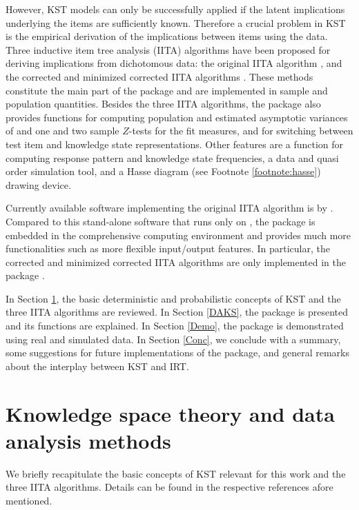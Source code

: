 \documentclass[nojss]{jss}
\begin{document}
However, KST models can only be successfully applied if the latent implications underlying the 
items are sufficiently known. Therefore a crucial problem in KST is the empirical derivation 
of the implications between items using the data.
Three inductive item tree analysis (IITA) algorithms have been proposed for deriving implications from dichotomous data: the original IITA algorithm \citep{Schrepp:03}, and the corrected and minimized corrected IITA algorithms \citep{SU:09, US:10}. These methods constitute the main part of the
package  and are implemented in sample and population quantities.
Besides the three IITA algorithms, the package  also provides functions for computing
population and estimated asymptotic variances of and one and two sample $Z$-tests for the fit
measures, and for switching between test item and knowledge state representations. Other features are a function for computing response pattern and knowledge state frequencies, a data and quasi
order simulation tool, and a Hasse diagram (see Footnote \ref{footnote:hasse}) drawing device.

Currently available software implementing the original IITA algorithm is  by \cite{Schrepp:06}. Compared to this stand-alone software that runs only on , 
the package  is embedded in the comprehensive  computing environment 
and provides much more functionalities such as more flexible input/output features. In particular,
the corrected and minimized corrected IITA algorithms are only implemented 
in the package .

In Section \ref{KST}, the basic deterministic and probabilistic concepts of KST and the three IITA algorithms are reviewed. In Section \ref{DAKS}, the package  is presented and its functions are explained. In Section \ref{Demo}, the package  is demonstrated using real and simulated data. In Section \ref{Conc}, we conclude with a summary, some suggestions 
for future implementations of the package, and general remarks 
about the interplay between KST and IRT.

\section{Knowledge space theory and data analysis methods}
\label{KST}

We briefly recapitulate the basic concepts of KST relevant for this work and the three IITA algorithms. Details can be found in the 
respective references afore mentioned.
\end{document}
